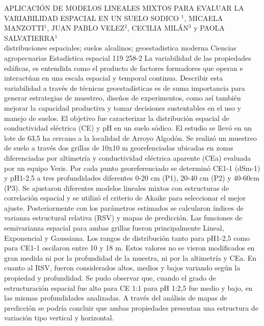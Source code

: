 \A
{APLICACIÓN DE MODELOS LINEALES MIXTOS PARA EVALUAR LA VARIABILIDAD ESPACIAL EN UN SUELO SODICO}
{$^1$, MICAELA MANZOTTI$^1$, JUAN PABLO VELEZ$^2$, CECILIA MILÁN$^3$ y PAOLA SALVATIERRA$^1$}
{
\\}
{distribuciones espaciales; suelos alcalinos; geoestadistica moderna} 
 {Ciencias agropecuarias} 
 {Estadística espacial} 
 {119} 
 {258-2}
{La variabilidad de las propiedades edáficas, es entendida como el producto de factores formadores que operan e interactúan en una escala espacial y temporal continua. Describir esta variabilidad a través de técnicas geoestadísticas es de suma importancia para generar estrategias de muestreo, diseños de experimentos, como así también mejorar la capacidad productiva y tomar decisiones sustentables en el uso y manejo de suelos. El objetivo fue caracterizar la distribución espacial de conductividad eléctrica (CE) y pH en un suelo sódico. El estudio se llevó en un lote de 63,5 ha cercano a la localidad de Arroyo Algodón. Se realizó un muestreo de suelo a través dos grillas de 10x10 m georefenciadas ubicadas en zonas diferenciadas por altimetría y conductividad eléctrica aparente (CEa) evaluada por un equipo Veris. Por cada punto georeferenciado se determinó CE1-1 (dSm-1) y pH1-2,5 a tres profundidades diferentes 0-20 cm (P1), 20-40 cm (P2) y 40-60cm (P3). Se ajustaron diferentes modelos lineales mixtos con estructuras de correlación espacial y se utilizó el criterio de Akaike para seleccionar el mejor ajuste. Posteriormente con los parámetros estimados se calcularon índices de varianza estructural relativa (RSV) y mapas de predicción. Las funciones de semivarianza espacial para ambas grillas fueron principalmente Lineal, Exponencial y Gaussiana. Los rangos de distribución tanto para pH1-2,5 como para CE1-1 oscilaron entre 10 y 18 m. Estos valores no se vieron modificados en gran medida ni por la profundidad de la muestra, ni por la altimetría y CEa. En cuanto al RSV, fueron considerados altos, medios y bajos variando según la propiedad y profundidad. Se pudo observar que, cuando el grado de estructuración espacial fue alto para CE 1:1 para pH 1:2,5 fue medio y bajo, en las mismas profundidades analizadas. A través del análisis de mapas de predicción se podría concluir que ambas propiedades presentan una estructura de variación tipo vertical y horizontal.}
